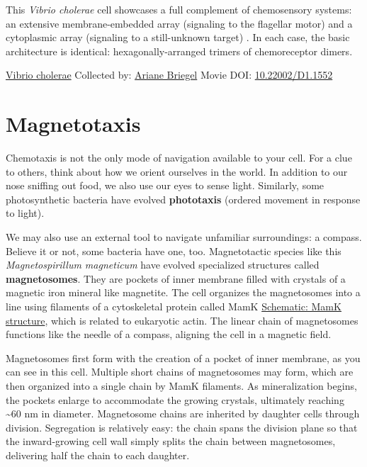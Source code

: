 \documentclass[]{tufte-book}
\begin{document}
This \emph{Vibrio cholerae} cell showcases a full complement of chemosensory systems: an extensive membrane-embedded array (signaling to the flagellar motor) and a cytoplasmic array (signaling to a still-unknown target) . In each case, the basic architecture is identical: hexagonally-arranged trimers of chemoreceptor dimers.



\hypertarget{htmlwidget-ed0bcafe213910566757}{}

\label{fig:7-5a}\protect\hyperlink{tree}{Vibrio cholerae} Collected by: \protect\hyperlink{ariane_briegel}{Ariane Briegel} Movie DOI: \href{https://doi.org/10.22002/D1.1552}{10.22002/D1.1552}

\hypertarget{magnetotaxis}{%
\section{Magnetotaxis}\label{magnetotaxis}}

Chemotaxis is not the only mode of navigation available to your cell. For a clue to others, think about how we orient ourselves in the world. In addition to our nose sniffing out food, we also use our eyes to sense light. Similarly, some photosynthetic bacteria have evolved \textbf{phototaxis} (ordered movement in response to light).

We may also use an external tool to navigate unfamiliar surroundings: a compass. Believe it or not, some bacteria have one, too. Magnetotactic species like this \emph{Magnetospirillum magneticum} have evolved specialized structures called \textbf{magnetosomes}. They are pockets of inner membrane filled with crystals of a magnetic iron mineral like magnetite. The cell organizes the magnetosomes into a line using filaments of a cytoskeletal protein called MamK \protect\hyperlink{MamK_structure}{Schematic: MamK structure}, which is related to eukaryotic actin. The linear chain of magnetosomes functions like the needle of a compass, aligning the cell in a magnetic field.

Magnetosomes first form with the creation of a pocket of inner membrane, as you can see in this cell. Multiple short chains of magnetosomes may form, which are then organized into a single chain by MamK filaments. As mineralization begins, the pockets enlarge to accommodate the growing crystals, ultimately reaching \textasciitilde{}60 nm in diameter. Magnetosome chains are inherited by daughter cells through division. Segregation is relatively easy: the chain spans the division plane so that the inward-growing cell wall simply splits the chain between magnetosomes, delivering half the chain to each daughter.
\end{document}
